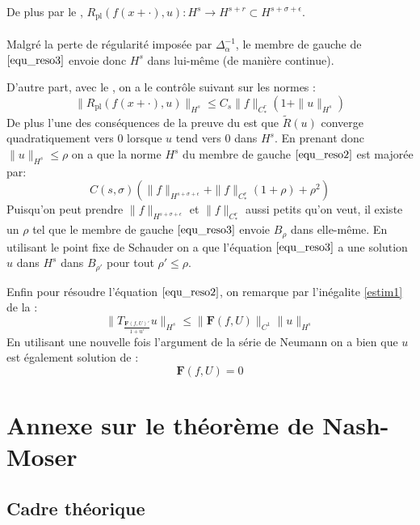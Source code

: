 \documentclass[11pt,a4paper]{article}
\begin{document}
De plus par le , $R_{\text{pl}}(f(x+\cdot),u):  H^s \to H^{s+r} \subset H^{s+\sigma +\epsilon}$.
\\ 
\\
Malgré la perte de régularité imposée par  $\Delta_\alpha^{-1}$, le membre de gauche de $\eqref{equ_reso3}$ envoie donc $H^s$ dans lui-même (de manière continue).
\par
D'autre part, avec le , on a le contrôle suivant sur les normes :
\begin{equation*}
\|R_{\text{pl}}(f(x+\cdot),u)\|_{H^s} \leq C_s \|f\|_{C^r_*} (1+\|u\|_{H^s})
\end{equation*} 
De plus l'une des conséquences de la preuve du  est que $\tilde{R}(u)$ converge quadratiquement vers 0 lorsque $u$ tend vers 0 dans $H^s$. En prenant donc  $\|u\|_{H^s} \leq \rho $ on a que la norme $H^s$ du membre de gauche $\eqref{equ_reso2}$ est majorée par:
\begin{equation}
C(s,\sigma) ( \|f\|_{H^{s+\sigma+\epsilon}} +\|f\|_{C^r_*} (1+\rho) + \rho^2)
\end{equation} 
Puisqu'on peut prendre $\|f\|_{H^{s+\sigma+\epsilon}}$ et $\|f\|_{C^r_*}$ aussi petits qu'on veut, il existe un $\rho$ tel que le membre de gauche $\ref{equ_reso3}$ envoie $B_\rho$ dans elle-même. En utilisant le point fixe de Schauder on a que l'équation $\ref{equ_reso3}$ a une solution $u$ dans $H^s$ dans $B_{\rho'}$ pour tout $\rho' \leq \rho$. \\
\par
Enfin pour résoudre l'équation $\eqref{equ_reso2}$, on remarque par l'inégalite \eqref{estim1} de la  :
\begin{equation}
\|T_{\frac{\mathbf{F}(f,U)'}{1+u'}}u\|_{H^s} \leq \|\mathbf{F}(f,U)\|_{C^1}\|u\|_{H^s}
\end{equation}
En utilisant une nouvelle fois l'argument de la série de Neumann on a bien que $u$ est également solution de :
\begin{equation}
\mathbf{F}(f,U)=0
\end{equation}

\newpage
\section{Annexe sur le théorème de Nash-Moser}
\subsection{Cadre théorique}
\end{document}

